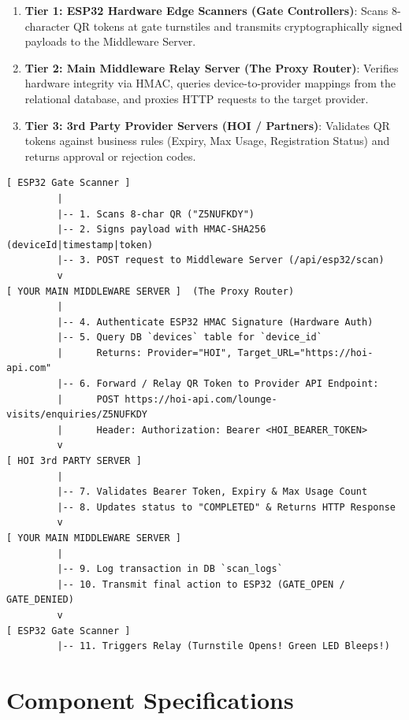 \documentclass[12pt,a4paper]{article}
\begin{document}
\begin{enumerate}
    \item \textbf{Tier 1: ESP32 Hardware Edge Scanners (Gate Controllers)}: Scans 8-character QR tokens at gate turnstiles and transmits cryptographically signed payloads to the Middleware Server.
    \item \textbf{Tier 2: Main Middleware Relay Server (The Proxy Router)}: Verifies hardware integrity via HMAC, queries device-to-provider mappings from the relational database, and proxies HTTP requests to the target provider.
    \item \textbf{Tier 3: 3rd Party Provider Servers (HOI / Partners)}: Validates QR tokens against business rules (Expiry, Max Usage, Registration Status) and returns approval or rejection codes.
\end{enumerate}

\begin{lstlisting}[caption={System Architecture Data Flow Diagram}]
[ ESP32 Gate Scanner ]
         |
         |-- 1. Scans 8-char QR ("Z5NUFKDY")
         |-- 2. Signs payload with HMAC-SHA256 (deviceId|timestamp|token)
         |-- 3. POST request to Middleware Server (/api/esp32/scan)
         v
[ YOUR MAIN MIDDLEWARE SERVER ]  (The Proxy Router)
         |
         |-- 4. Authenticate ESP32 HMAC Signature (Hardware Auth)
         |-- 5. Query DB `devices` table for `device_id`
         |      Returns: Provider="HOI", Target_URL="https://hoi-api.com"
         |-- 6. Forward / Relay QR Token to Provider API Endpoint:
         |      POST https://hoi-api.com/lounge-visits/enquiries/Z5NUFKDY
         |      Header: Authorization: Bearer <HOI_BEARER_TOKEN>
         v
[ HOI 3rd PARTY SERVER ]
         |
         |-- 7. Validates Bearer Token, Expiry & Max Usage Count
         |-- 8. Updates status to "COMPLETED" & Returns HTTP Response
         v
[ YOUR MAIN MIDDLEWARE SERVER ]
         |
         |-- 9. Log transaction in DB `scan_logs`
         |-- 10. Transmit final action to ESP32 (GATE_OPEN / GATE_DENIED)
         v
[ ESP32 Gate Scanner ]
         |-- 11. Triggers Relay (Turnstile Opens! Green LED Bleeps!)
\end{lstlisting}

\newpage
\section{Component Specifications}
\end{document}
